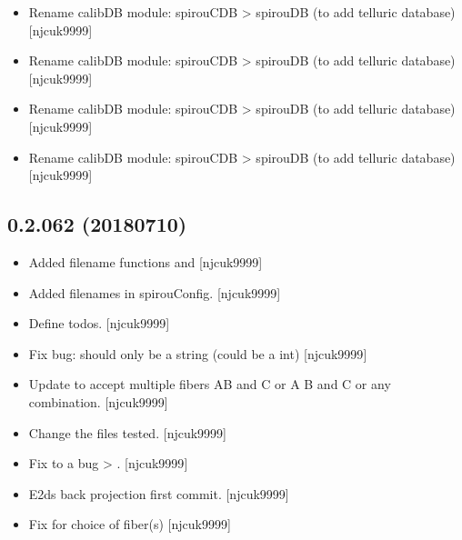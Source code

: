 \documentclass[a4paper,10pt,english]{report}
\begin{document}
\begin{itemize}
\item {} 
Rename calibDB module: spirouCDB \textendash{}\textgreater{} spirouDB (to add telluric
database) {[}njcuk9999{]}

\item {} 
Rename calibDB module: spirouCDB \textendash{}\textgreater{} spirouDB (to add telluric
database) {[}njcuk9999{]}

\item {} 
Rename calibDB module: spirouCDB \textendash{}\textgreater{} spirouDB (to add telluric
database) {[}njcuk9999{]}

\item {} 
Rename calibDB module: spirouCDB \textendash{}\textgreater{} spirouDB (to add telluric
database) {[}njcuk9999{]}

\end{itemize}


\subsection{0.2.062 (2018\sphinxhyphen{}07\sphinxhyphen{}10)}
\label{\detokenize{misc/changelog:id416}}\begin{itemize}
\item {} 
Added filename functions  and 
{[}njcuk9999{]}

\item {} 
Added filenames in spirouConfig. {[}njcuk9999{]}

\item {} 
Define todos. {[}njcuk9999{]}

\item {} 
Fix bug:  should only be a string (could be a int)
{[}njcuk9999{]}

\item {} 
Update to accept multiple fibers AB and C or A B and C or any
combination. {[}njcuk9999{]}

\item {} 
Change the files tested. {[}njcuk9999{]}

\item {} 
Fix to a bug  \textendash{}\textgreater{} . {[}njcuk9999{]}

\item {} 
E2ds back projection \sphinxhyphen{} first commit. {[}njcuk9999{]}

\item {} 
Fix for choice of fiber(s) {[}njcuk9999{]}

\end{itemize}
\end{document}
